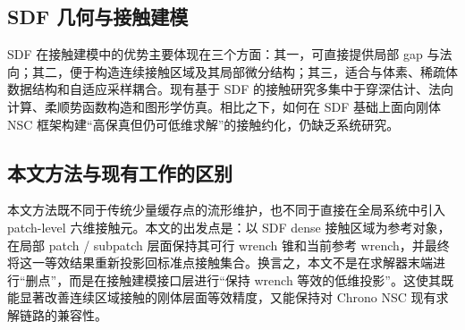 \subsection{SDF 几何与接触建模}

SDF 在接触建模中的优势主要体现在三个方面：其一，可直接提供局部 gap 与法向；其二，便于构造连续接触区域及其局部微分结构；其三，适合与体素、稀疏体数据结构和自适应采样耦合。现有基于 SDF 的接触研究多集中于穿深估计、法向计算、柔顺势函数构造和图形学仿真。相比之下，如何在 SDF 基础上面向刚体 NSC 框架构建“高保真但仍可低维求解”的接触约化，仍缺乏系统研究。

\subsection{本文方法与现有工作的区别}

本文方法既不同于传统少量缓存点的流形维护，也不同于直接在全局系统中引入 patch-level 六维接触元。本文的出发点是：以 SDF dense 接触区域为参考对象，在局部 patch / subpatch 层面保持其可行 wrench 锥和当前参考 wrench，并最终将这一等效结果重新投影回标准点接触集合。换言之，本文不是在求解器末端进行“删点”，而是在接触建模接口层进行“保持 wrench 等效的低维投影”。这使其既能显著改善连续区域接触的刚体层面等效精度，又能保持对 Chrono NSC 现有求解链路的兼容性。
